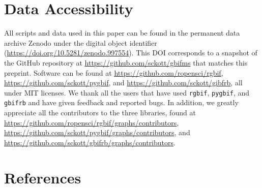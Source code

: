 \documentclass[3p]{elsarticle} %
\begin{document}
\hypertarget{data-accessibility}{%
\section{Data Accessibility}\label{data-accessibility}}

All scripts and data used in this paper can be found in the permanent
data archive Zenodo under the digital object identifier
(\url{https://doi.org/10.5281/zenodo.997554}). This DOI corresponds to a
snapshot of the GitHub repository at
\url{https://github.com/sckott/gbifms} that matches this preprint.
Software can be found at \url{https://github.com/ropensci/rgbif},
\url{https://github.com/sckott/pygbif}, and
\url{https://github.com/sckott/gibfrb}, all under MIT licenses. We thank
all the users that have used \texttt{rgbif}, \texttt{pygbif}, and
\texttt{gbifrb} and have given feedback and reported bugs. In addition,
we greatly appreciate all the contributors to the three libraries, found
at \url{https://github.com/ropensci/rgbif/graphs/contributors},
\url{https://github.com/sckott/pygbif/graphs/contributors}, and
\url{https://github.com/sckott/gbifrb/graphs/contributors}.

\hypertarget{references}{%
\section*{References}\label{references}}
\end{document}
